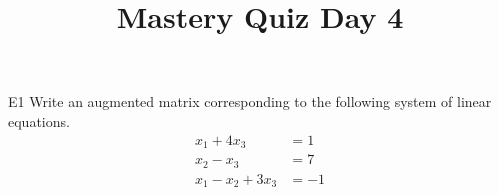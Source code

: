 \documentclass{sbgLAquiz}
\title{Mastery Quiz Day 4 }
\begin{document}
\begin{problem}{E1}
Write an augmented matrix corresponding to the following system of linear equations.
\begin{align*}
x_1+4x_3 &= 1 \\
x_2-x_3 &= 7 \\
x_1-x_2+3x_3 &= -1
\end{align*}
\end{problem}
\end{document}
